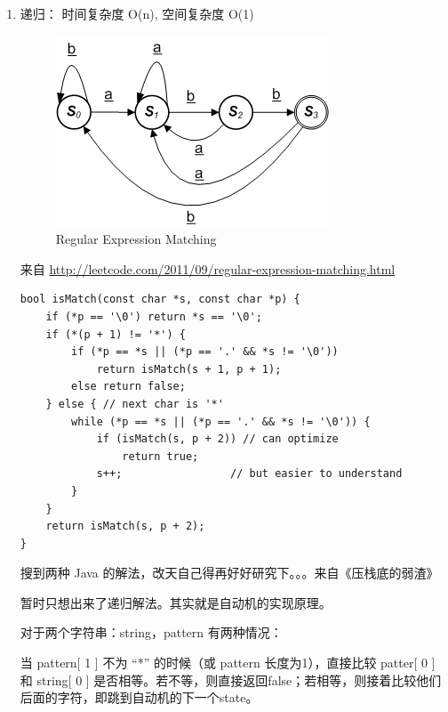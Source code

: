 \documentclass[12pt]{book}
\begin{document}
\begin{enumerate}
\item 递归： 时间复杂度 O(n), 空间复杂度 O(1)
\label{sec-14-3-9-1}

\begin{figure}[htb]
\centering
\includegraphics[width=.9\linewidth]{./pic/regularExpressionMatching.png}
\caption{Regular Expression Matching}
\end{figure}

来自 \url{http://leetcode.com/2011/09/regular-expression-matching.html}

\lstset{language=java,label= ,caption= ,numbers=none}
\begin{lstlisting}
bool isMatch(const char *s, const char *p) {  
    if (*p == '\0') return *s == '\0'; 
    if (*(p + 1) != '*') {  
        if (*p == *s || (*p == '.' && *s != '\0'))
            return isMatch(s + 1, p + 1);
        else return false;
    } else { // next char is '*'
        while (*p == *s || (*p == '.' && *s != '\0')) {
            if (isMatch(s, p + 2)) // can optimize
                return true;
            s++;                 // but easier to understand
        }
    }
    return isMatch(s, p + 2);
}
\end{lstlisting}

搜到两种 Java 的解法，改天自己得再好好研究下。。。来自《压栈底的弱渣》

暂时只想出来了递归解法。其实就是自动机的实现原理。

对于两个字符串：string，pattern 有两种情况：

当 pattern[ 1 ] 不为 “*” 的时候（或 pattern 长度为1），直接比较
patter[ 0 ] 和 string[ 0 ] 是否相等。若不等，则直接返回false；若相等，则接着比较他们后面的字符，即跳到自动机的下一个state。


\end{enumerate}
\end{document}
